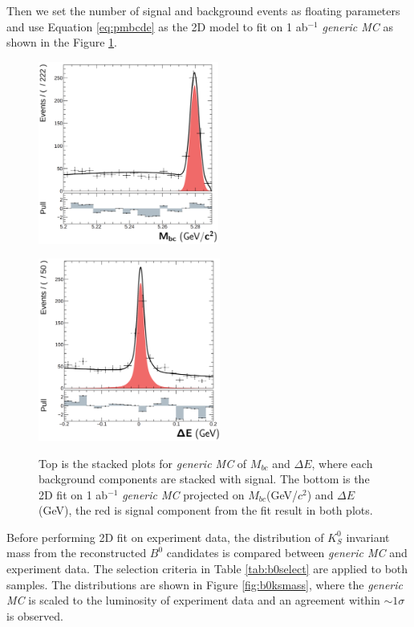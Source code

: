 Then we set the number of signal and background events as floating parameters and use Equation \ref{eq:pmbcde} as the 2D model to fit on 1 ab$^{-1}$ \textit{generic MC} as shown in the Figure \ref{fig:2Dgen}.

\begin{figure}[htpb]
	\begin{minipage}[b]{0.5\linewidth}
		\centering 
		\includegraphics[height=6cm]{figures/mbc_data_fit}
		\label{}
	\end{minipage}
	\begin{minipage}[b]{0.5\linewidth}
		\centering 
		\includegraphics[height=6cm]{figures/de_data_fit}
		\label{}
	\end{minipage}
	\caption{Top is the stacked plots for \textit{generic MC} of $M_{bc}$ and $\Delta E$, where each background components are stacked with signal. The bottom is the 2D fit on 1 ab$^{-1}$ \textit{generic MC} projected on $M_{bc}$(GeV/$c^2$) and $\Delta E$(GeV), the red is signal component from the fit result in both plots.}
	\label{fig:2Dgen}
\end{figure}

Before performing 2D fit on experiment data, the distribution of $K_S^0$ invariant mass from the reconstructed $B^0$ candidates is compared between \textit{generic MC} and experiment data. The selection criteria in Table \ref{tab:b0select} are applied to both samples. The distributions are shown in Figure \ref{fig:b0ksmass}, where the \textit{generic MC} is scaled to the luminosity of experiment data and an agreement within $\sim 1\sigma$ is observed. 

